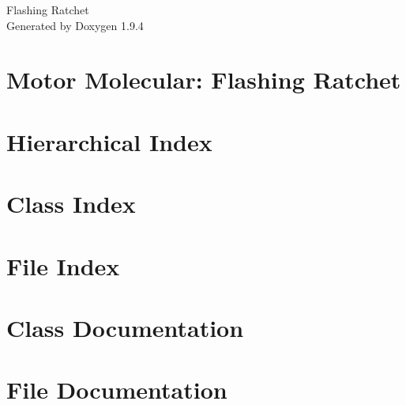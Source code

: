 \documentclass[twoside]{book}
\newcommand{\+}{\discretionary{\mbox{\scriptsize$\hookleftarrow$}}{}{}}
\newcommand{\clearemptydoublepage}{%
    \newpage{\pagestyle{empty}\cleardoublepage}%
  }
\begin{document}
  \raggedbottom
    \hypersetup{pageanchor=false,
                bookmarksnumbered=true,
                pdfencoding=unicode
               }
  \begin{titlepage}
  \vspace*{7cm}
  \begin{center}%
  {\Large Flashing Ratchet}\\
  \vspace*{1cm}
  {\large Generated by Doxygen 1.9.4}\\
  \end{center}
  \end{titlepage}
  \clearemptydoublepage
  \tableofcontents
  \clearemptydoublepage
  \hypersetup{pageanchor=true}
\chapter{Motor Molecular\+: Flashing Ratchet}
\label{md_README}

\chapter{Hierarchical Index}

\chapter{Class Index}

\chapter{File Index}

\chapter{Class Documentation}







\chapter{File Documentation}
















  \backmatter
  \newpage
  \clearemptydoublepage
  \printindex
\end{document}
